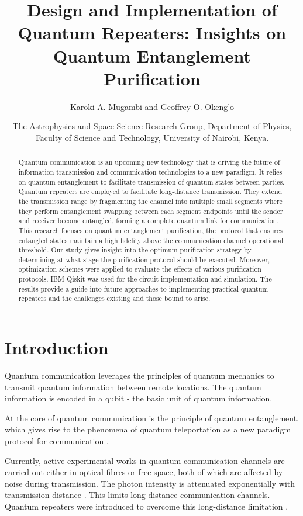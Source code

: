 \documentclass[11pt]{article}
\title{Design and Implementation of Quantum Repeaters: Insights on Quantum Entanglement Purification}
\author{Karoki A. Mugambi and Geoffrey O. Okeng'o}
\date{%
    The Astrophysics and Space Science Research Group, Department of Physics, Faculty of Science and Technology, University of Nairobi, Kenya.\\[2ex]%
}
\begin{document}
\maketitle

\begin{abstract}
Quantum communication is an upcoming new technology that is driving the future of information transmission and communication technologies to a new paradigm. It relies on quantum entanglement to facilitate transmission of quantum states between parties. Quantum repeaters are employed to facilitate long-distance transmission. They extend the transmission range by fragmenting the channel into multiple small segments where they perform entanglement swapping between each segment endpoints until the sender and receiver become entangled, forming a complete quantum link for communication. This research focuses on quantum entanglement purification, the protocol that ensures entangled states maintain a high fidelity above the communication channel operational threshold. Our study gives insight into the optimum purification strategy by determining at what stage the purification protocol should be executed. Moreover, optimization schemes were applied to evaluate the effects of various purification protocols. IBM Qiskit was used for the circuit implementation and simulation. The results provide a guide into future approaches to implementing practical quantum repeaters and the challenges existing and those bound to arise.
\end{abstract}


\section{Introduction}
Quantum communication leverages the principles of quantum mechanics to transmit quantum information between remote locations. The quantum information is encoded in a qubit - the basic unit of quantum information.

At the core of quantum communication is the principle of quantum entanglement, which gives rise to the phenomena of quantum teleportation as a new paradigm protocol for communication \cite{Bennett_1993}.

Currently, active experimental works in quantum communication channels are carried out either in optical fibres or free space, both of which are affected by noise during transmission. The photon intensity is attenuated exponentially with transmission distance \cite{Ruihong_2019}. This limits long-distance communication channels. Quantum repeaters were introduced to overcome this long-distance limitation \cite{Briegel_1998}.
\end{document}
